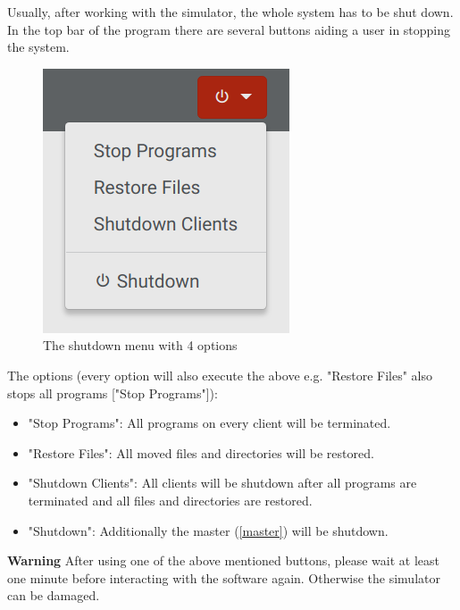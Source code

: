 \documentclass[accentcolor=tud1a, paper=a4, colorback]{tudreport}
\begin{document}
	Usually, after working with the simulator, the whole system has to be shut down. In the top
	bar of the program there are several buttons aiding a user in stopping the system.
	\begin{figure}[H]
		\centering
		\includegraphics[width=.2\textwidth]{shutdown_dropdown_menu}
		\caption{The shutdown menu with 4 options}
		\label{shutdown_dropdown_menu}
	\end{figure}
	The options (every option will also execute the above e.g. "Restore Files" also stops all programs ["Stop Programs"]):
	\begin{itemize}
		\item "Stop Programs": All programs on every client will be terminated.
		\item "Restore Files": All moved files and directories will be restored.
		\item "Shutdown Clients": All clients will be shutdown after all programs are terminated and all files and directories are restored.
		\item "Shutdown": Additionally the master (\ref{master}) will be shutdown.
	\end{itemize}
	\begin{tcolorbox}[width=\textwidth, colback=red!30, arc=0pt, boxrule=0pt]
	{\color{red}\textbf{Warning}}\hspace{0.5cm}
		After using one of the above mentioned buttons, please wait at least one minute before interacting with the software again.
		Otherwise the simulator can be damaged.
	\end{tcolorbox}
\end{document}
